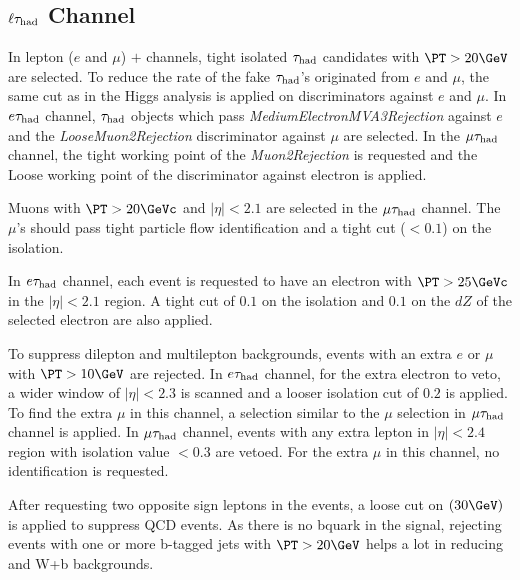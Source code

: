 \subsection{\texorpdfstring{$\ell\tau_{\rm had}$ Channel}{lepton-tau Channel}}
\label{sect:leptonTauCuts}
In lepton ($e$ and $\mu$) $+$ \Tau channels, tight isolated $\tau_{\rm had}$ candidates with $\PT > 20 \GeV$  are selected. To reduce the rate of the fake $\tau_{\rm had}$'s originated from $e$ and $\mu$, the same cut as in the Higgs analysis \cite{CMS_AN_2013-188} is applied on discriminators against $e$ and $\mu$. In $e\tau_{\rm had}$ channel, $\tau_{\rm had}$ objects which pass \emph{MediumElectronMVA3Rejection} against $e$ and the \emph{LooseMuon2Rejection} discriminator against $\mu$ are selected. In the $\mu\tau_{\rm had}$ channel, the tight working point of the \emph{Muon2Rejection} is requested and the Loose working point of the discriminator against electron is applied.

Muons with $\PT > 20 \GeVc$ and $|\eta|<2.1$ are selected in the $\mu\tau_{\rm had}$ channel. The $\mu$'s should pass tight particle flow identification and a tight cut ($<0.1$) on the isolation.
 
In $e\tau_{\rm had}$ channel, each event is requested to have an electron with $\PT >25 \GeVc$ in the $|\eta| < 2.1 $ region. A tight cut of $0.1$ on the isolation and $0.1$ on the $dZ$ of the selected electron are also applied.

To suppress dilepton and multilepton backgrounds, events with an extra $e$ or $\mu$ with $\PT >10 \GeV$ are rejected. In $e\tau_{\rm had}$ channel, for the extra electron to veto, a wider window of $|\eta|<2.3$ is scanned and a looser isolation cut of $0.2$ is applied. To find the extra $\mu$ in this channel, a selection similar to the $\mu$ selection in $\mu\tau_{\rm had}$ channel is applied. In $\mu\tau_{\rm had}$ channel, events with any extra lepton in $|\eta|<2.4$ region with isolation value $<0.3$ are vetoed. For the extra $\mu$ in this channel, no identification is requested.


After requesting two opposite sign leptons in the events, a loose cut on \MET $(30 \GeV)$ is applied to suppress QCD events. As there is no bquark in the signal, rejecting events with one or more b-tagged jets with $\PT > 20 \GeV$ helps a lot in reducing \ttbar and W+b backgrounds.

